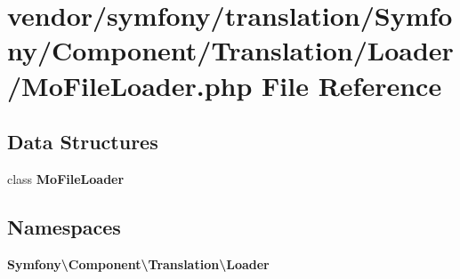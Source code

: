 \section{vendor/symfony/translation/\+Symfony/\+Component/\+Translation/\+Loader/\+Mo\+File\+Loader.php File Reference}
\label{_mo_file_loader_8php}
\subsection*{Data Structures}
\begin{DoxyCompactItemize}
\item 
class {\bf Mo\+File\+Loader}
\end{DoxyCompactItemize}
\subsection*{Namespaces}
\begin{DoxyCompactItemize}
\item 
 {\bf Symfony\textbackslash{}\+Component\textbackslash{}\+Translation\textbackslash{}\+Loader}
\end{DoxyCompactItemize}
